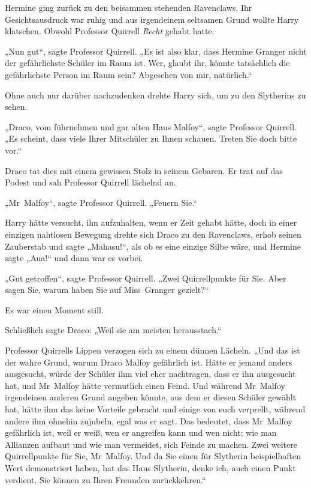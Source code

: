 {Hermine ging zurück zu den beisammen stehenden Ravenclaws. Ihr Gesichtsausdruck war ruhig und aus irgendeinem seltsamen Grund wollte Harry klatschen. Obwohl Professor Quirrell \emph{Recht} gehabt hatte.

„Nun gut“, sagte Professor Quirrell. „Es ist also klar, dass Hermine Granger nicht der gefährlichste Schüler im Raum ist. Wer, glaubt ihr, könnte tatsächlich die gefährlichste Person im Raum sein? Abgesehen von mir, natürlich.“

Ohne auch nur darüber nachzudenken drehte Harry sich, um zu den Slytherins zu sehen.

„Draco, vom führnehmen und gar alten Haus Malfoy“, sagte Professor Quirrell. „Es scheint, dass viele Ihrer Mitschüler zu Ihnen schauen. Treten Sie doch bitte vor.“

Draco tat dies mit einem gewissen Stolz in seinem Gebaren. Er trat auf das Podest und sah Professor Quirrell lächelnd an.

„Mr~Malfoy“, sagte Professor Quirrell. „Feuern Sie.“

Harry hätte versucht, ihn aufzuhalten, wenn er Zeit gehabt hätte, doch in einer einzigen nahtlosen Bewegung drehte sich Draco zu den Ravenclaws, erhob seinen Zauberstab und sagte „Mahasu!“, als ob es eine einzige Silbe wäre, und Hermine sagte „Aua!“ und dann war es vorbei.

„Gut getroffen“, sagte Professor Quirrell. „Zwei Quirrellpunkte für Sie. Aber sagen Sie, warum haben Sie auf Miss~Granger gezielt?“

Es war einen Moment still.

Schließlich sagte Draco: „Weil sie am meisten herausstach.“

Professor Quirrells Lippen verzogen sich zu einem dünnen Lächeln. „Und das ist der wahre Grund, warum Draco Malfoy gefährlich ist. Hätte er jemand anders ausgesucht, würde der Schüler ihm viel eher nachtragen, dass er ihn ausgesucht hat, und Mr~Malfoy hätte vermutlich einen Feind. Und während Mr~Malfoy irgendeinen anderen Grund angeben könnte, aus dem er diesen Schüler gewählt hat, hätte ihm das keine Vorteile gebracht und einige von euch verprellt, während andere ihm ohnehin zujubeln, egal was er sagt. Das bedeutet, dass Mr~Malfoy gefährlich ist, weil er weiß, wen er angreifen kann und wen nicht; wie man Allianzen aufbaut und wie man vermeidet, sich Feinde zu machen. Zwei weitere Quirrellpunkte für Sie, Mr~Malfoy. Und da Sie einen für Slytherin beispielhaften Wert demonstriert haben, hat das Haus Slytherin, denke ich, auch einen Punkt verdient. Sie können zu Ihren Freunden zurückkehren.“

}
